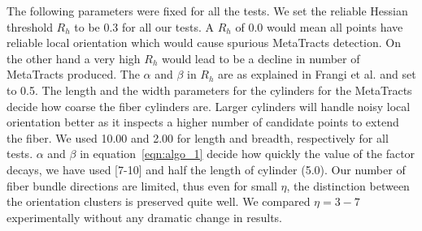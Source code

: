 The following parameters were fixed for all the tests. We set the reliable Hessian threshold $R_{h}$ to be 0.3 for all our tests. A $R_{h}$ of 0.0 would mean all points have reliable local orientation which would cause spurious MetaTracts detection. On the other hand a very high $ R_{h}$ would lead to be a decline in number of MetaTracts produced. The $\alpha$ and $\beta$ in $R_{h}$ are as explained in Frangi et al. \cite{Frangi1998} and set to 0.5. The length and the width parameters for the cylinders for the MetaTracts decide how coarse the fiber cylinders are. Larger cylinders will handle noisy local orientation better as it inspects a higher number of candidate points to extend the fiber. We used 10.00 and 2.00 for length and breadth, respectively for all tests. $\alpha$ and $\beta$ in equation~\ref{eqn:algo_1} decide how quickly the value of the factor decays, we have used [7-10] and half the length of cylinder (5.0). Our number of fiber bundle directions are limited, thus even for small $\eta$, the distinction between the orientation clusters is preserved quite well. We compared  $\eta=3-7$ experimentally without any dramatic change in results. 



